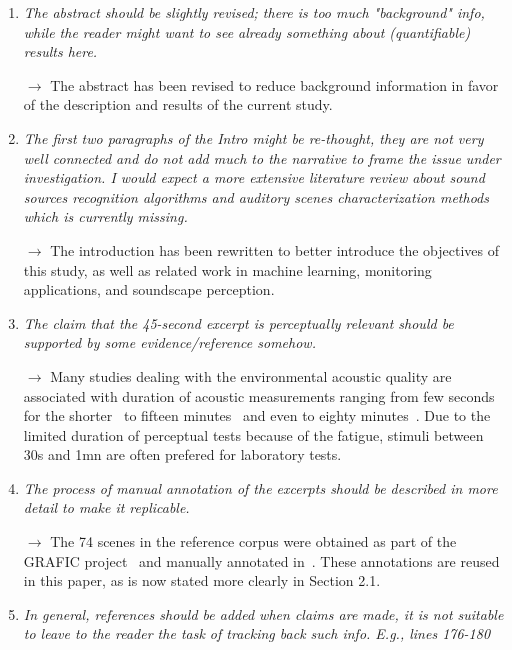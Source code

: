 \documentclass[10pt]{article}
\begin{document}
\begin{enumerate}

\item \emph{The abstract should be slightly revised; there is too much "background" info, while the reader might want to see already something about (quantifiable) results here.}

$\rightarrow$ The abstract has been revised to reduce background information in favor of the description and results of the current study.

\item \emph{The first two paragraphs of the Intro might be re-thought, they are not very well connected and do not add much to the narrative to frame the issue under investigation. I would expect a more extensive literature review about sound sources recognition algorithms and auditory scenes characterization methods which is currently missing.}

$\rightarrow$ The introduction has been rewritten to better introduce the objectives of this study, as well as related work in machine learning, monitoring applications, and soundscape perception.

\item \emph{The claim that the 45-second excerpt is perceptually relevant should be supported by some evidence/reference somehow.}

$\rightarrow$ Many studies dealing with the environmental acoustic quality are associated with duration of acoustic measurements ranging from few seconds for the shorter~\cite{paulsen1997, brambilla2006} to fifteen minutes~\cite{kuwano1997, decoensel2007} and even to eighty minutes~\cite{namba1988}. Due to the limited duration of perceptual tests because of the fatigue, stimuli between 30s and 1mn are often prefered for laboratory tests.

\item \emph{The process of manual annotation of the excerpts should be described in more detail to make it replicable.}

$\rightarrow$ The 74 scenes in the reference corpus were obtained as part of the GRAFIC project~\cite{aumond2017} and manually annotated in~\cite{gloaguen2017}. These annotations are reused in this paper, as is now stated more clearly in Section 2.1.

\item \emph{In general, references should be added when claims are made, it is not suitable to leave to the reader the task of tracking back such info. E.g., lines 176-180}


\end{enumerate}
\end{document}
